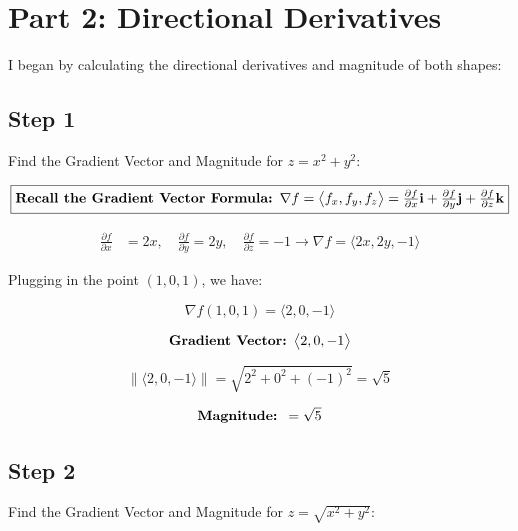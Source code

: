 \documentclass[english]{article}
\begin{document}
\section{Part 2: Directional Derivatives}\label{methods}

I began by calculating the directional derivatives and magnitude of both shapes:


\subsection{Step 1}

Find the Gradient Vector and Magnitude for $z = x^2 + y^2 $:

$$\fbox{\textbf{Recall the Gradient Vector Formula: $\nabla f = \bigl \langle f_{x}, f_{y}, f_{z} \bigr \rangle = \frac{\partial f}{\partial x} \bold{i} + \frac{\partial f}{\partial y} \bold{j} + \frac{\partial f}{\partial z} \bold{k}$}}$$

\begin{align*}
    \frac{\partial f}{\partial x} &= 2x, \quad
    \frac{\partial f}{\partial y} = 2y, \quad
    \frac{\partial f}{\partial z} = -1 
    \longrightarrow \nabla f = \bigl \langle 2x, 2y, -1 \bigr \rangle
\end{align*}



Plugging in the point $(1,0,1)$, we have:

 $$ \nabla f(1,0,1) = \bigl \langle 2, 0, -1 \bigr \rangle $$

\begin{align*}
    \text{\textbf{Gradient Vector: }} \bigl \langle 2, 0, -1 \bigr \rangle
\end{align*}

$$\left\lVert \bigl \langle 2, 0, -1 \bigr\rangle \right\rVert = \sqrt{2^2 + 0^2 + (-1)^2} = \sqrt{5} $$

\begin{align*}
    \text{\textbf{Magnitude: }} = \sqrt{5}
\end{align*}


\subsection{Step 2}

Find the Gradient Vector and Magnitude for $z =\sqrt{x^2 + y^2 }$:
\end{document}
